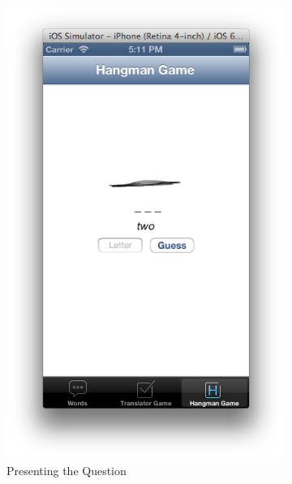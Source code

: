 \documentclass[11pt, a4paper]{article}
\begin{document}
\begin{figure}[h]
\centering
\begin{subfigure}[b]{0.3\textwidth}
\includegraphics[width=\textwidth]{img/hangman}
\caption{Presenting the Question}
\end{subfigure}
\begin{subfigure}[b]{0.3\textwidth}

\end{subfigure}
\end{figure}
\end{document}
